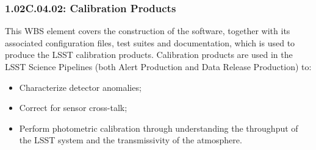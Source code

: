 \subsubsection{1.02C.04.02: Calibration Products}

This WBS element covers the construction of the software, together with
its associated configuration files, test suites and documentation, which
is used to produce the LSST calibration products. Calibration products
are used in the LSST Science Pipelines (both Alert Production and Data
Release Production) to:

\begin{itemize}

\item{Characterize detector anomalies;}
\item{Correct for sensor cross-talk;}
\item{Perform photometric calibration through understanding the throughput of
      the LSST system and the transmissivity of the atmosphere.}

\end{itemize}
